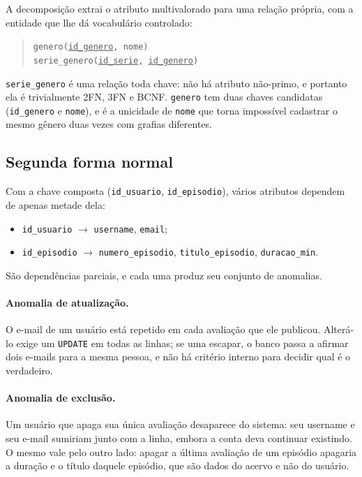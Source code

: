 \documentclass[a4paper,12pt,oneside,openany]{book}
\newcommand{\id}[1]{\texttt{#1}}
\begin{document}
A decomposição extrai o atributo multivalorado para uma relação própria, com a
entidade que lhe dá vocabulário controlado:

\begin{quote}
\id{genero(\underline{id\_genero}, nome)}\\
\id{serie\_genero(\underline{id\_serie}, \underline{id\_genero})}
\end{quote}

\id{serie\_genero} é uma relação toda chave: não há atributo não-primo, e portanto ela
é trivialmente 2FN, 3FN e BCNF. \id{genero} tem duas chaves candidatas
(\id{id\_genero} e \id{nome}), e é a unicidade de \id{nome} que torna impossível
cadastrar o mesmo gênero duas vezes com grafias diferentes.

\subsection{Segunda forma normal}

Com a chave composta (\id{id\_usuario}, \id{id\_episodio}), vários atributos dependem
de apenas metade dela:

\begin{itemize}[nosep]
    \item \id{id\_usuario} $\rightarrow$ \id{username}, \id{email};
    \item \id{id\_episodio} $\rightarrow$ \id{numero\_episodio},
    \id{titulo\_episodio}, \id{duracao\_min}.
\end{itemize}

São dependências parciais, e cada uma produz seu conjunto de anomalias.

\paragraph{Anomalia de atualização.} O e-mail de um usuário está repetido em cada
avaliação que ele publicou. Alterá-lo exige um \id{UPDATE} em todas as linhas; se
uma escapar, o banco passa a afirmar dois e-mails para a mesma pessoa, e não há
critério interno para decidir qual é o verdadeiro.

\paragraph{Anomalia de exclusão.} Um usuário que apaga sua única avaliação
desaparece do sistema: seu username e seu e-mail sumiriam junto com a linha, embora
a conta deva continuar existindo. O mesmo vale pelo outro lado: apagar a última
avaliação de
um episódio apagaria a duração e o título daquele episódio, que são dados do acervo e
não do usuário.
\end{document}
